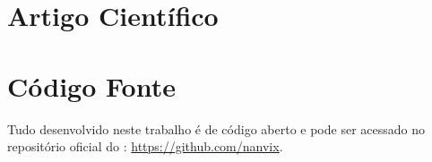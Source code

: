 

\apendices

\chapter{Artigo Científico}
\label{chap:apendice}



\chapter{Código Fonte}

Tudo desenvolvido neste trabalho é de código aberto e pode ser acessado no repositório oficial do \nanvix: \url{https://github.com/nanvix}.

